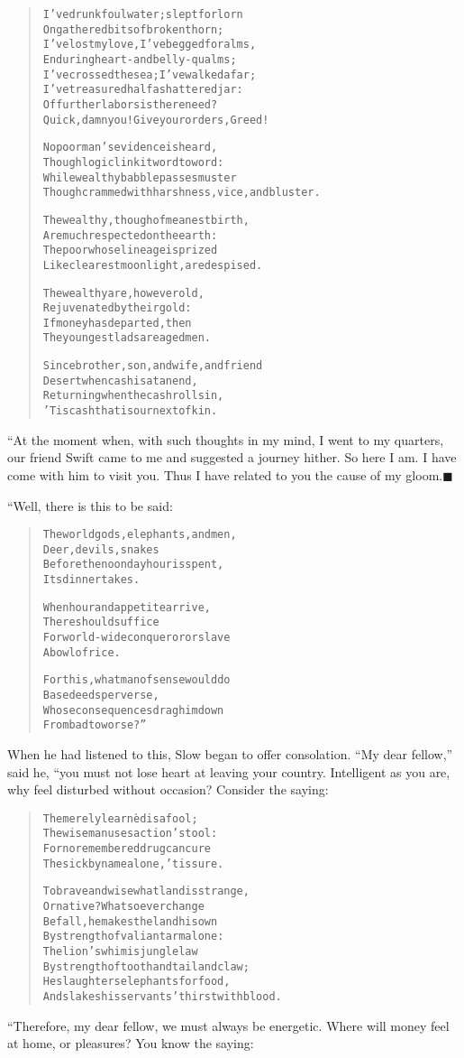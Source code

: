 \documentclass[article, twoside, 14pt]{memoir}
\newcommand{\qed}{\hfill \ensuremath{\blacksquare}}
\renewenvironment{verbatim}{%
\begin{quote}%
\vskip -10pt%
\begin{alltt}\normalfont\large}{\end{alltt}%
\end{quote}%
\vskip -10pt
} %
\begin{document}
\begin{verbatim}
I've drunk foul water; slept forlorn
On gathered bits of broken thorn;
I've lost my love, I've begged for alms,
Enduring heart- and belly-qualms;
I've crossed the sea; I've walked afar;
I've treasured half a shattered jar:
Of further labors is there need?
Quick, damn you! Give your orders, Greed!

No poor man's evidence is heard,
Though logic link it word to word:
While wealthy babble passes muster
Though crammed with harshness, vice, and bluster.

The wealthy, though of meanest birth,
Are much respected on the earth:
The poor whose lineage is prized
Like clearest moonlight, are despised.

The wealthy are, however old,
Rejuvenated by their gold:
If money has departed, then
The youngest lads are aged men.

Since brother, son, and wife, and friend
Desert when cash is at an end,
Returning when the cash rolls in,
'Tis cash that is our next of kin.
\end{verbatim}
“At the moment when, with such thoughts in my mind, I went to my
quarters, our friend Swift came to me and suggested a journey
hither. So here I am. I have come with him to visit you. Thus I
have related to you the cause of my gloom.\hyperref[s38]{\qed}

“Well, there is this to be said:

\begin{verbatim}
The world{\textemdash}gods, elephants, and men,
    Deer, devils, snakes{\textemdash}
Before the noonday hour is spent,
    Its dinner takes.

When hour and appetite arrive,
    There should suffice
For world-wide conqueror or slave
    A bowl of rice.

For this, what man of sense would do
    Base deeds perverse,
Whose consequences drag him down
    From bad to worse?”
\end{verbatim}
When he had listened to this, Slow began to offer consolation.
``My dear fellow,'' said he, “you must not lose heart at leaving
your country. Intelligent as you are, why feel disturbed without
occasion? Consider the saying:

\begin{verbatim}
The merely learnèd is a fool;
The wise man uses action's tool:
For no remembered drug can cure
The sick by name alone, 'tis sure.

To brave and wise what land is strange,
Or native? Whatsoever change
Befall, he makes the land his own
By strength of valiant arm alone:
The lion's whim is jungle law
By strength of tooth and tail and claw;
He slaughters elephants for food,
And slakes his servants' thirst with blood.
\end{verbatim}
“Therefore, my dear fellow, we must always be energetic. Where will
money feel at home, or pleasures? You know the saying:
\end{document}
